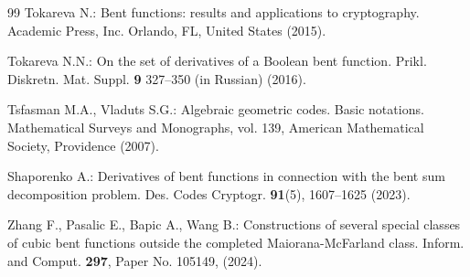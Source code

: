 \documentclass[a4paper,12pt]{article}   %
\begin{document}
\begin{thebibliography}{99}
Tokareva N.: Bent functions: results and applications to
cryptography.     Academic Press, Inc. %
Orlando, FL, United States (2015).

Tokareva N.N.: On the set of derivatives of a Boolean bent function.
Prikl. Diskretn. Mat. Suppl. {\bf 9} 327--350 (in Russian) (2016).




Tsfasman M.A.,   Vladuts S.G.: Algebraic geometric codes. Basic
notations.  Mathematical Surveys and Monographs, vol. 139, American
Mathematical Society, Providence  (2007).


 Shaporenko A.: Derivatives of bent functions in connection with
the bent sum decomposition problem. Des. Codes Cryptogr. {\bf
91}(5), 1607--1625 (2023).

 Zhang F., Pasalic E., Bapic A., Wang B.:
  Constructions of several special classes of cubic bent functions
  outside the completed Maiorana-McFarland class.
 Inform. and Comput. {\bf 297}, Paper No. 105149,  (2024).



\end{thebibliography}
\end{document}
